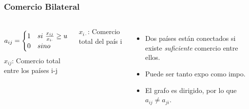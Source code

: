\documentclass[professionalfont,fleqn]{beamer}
\begin{document}
		\begin{frame}
		\frametitle{Comercio Bilateral}
		
		\begin{columns}[t]
			
				\begin{equation*}
				a_{ij} = 
				\begin{cases} 
				1 & si \ \frac{x_{ij}}{x_{i\cdot}}\geq u \\
				0 & sino 
				\end{cases}
				$$
				\end{equation*}
				$x_{ij}$: Comercio total entre los países i-j \par
				$x_{i\cdot}$: Comercio total del país i
			
			
			\begin{itemize}
				\item Dos países están conectados si existe \textit{suficiente} comercio entre ellos.
				\item Puede ser tanto expo como impo.
				\item El grafo es dirigido, por lo que $a_{ij} \neq a_{ji}$.
			\end{itemize}
			
		\end{columns}
		
		\end{frame}
		
				
		
\end{document}
